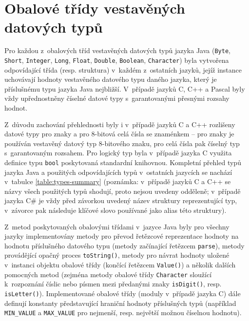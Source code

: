 \documentclass[czech,BP]{thesiskiv}
\begin{document}
\section{Obalové třídy vestavěných datových typů}
Pro každou z~obalových tříd vestavěných datových typů jazyka Java (\texttt{Byte}, \texttt{Short}, \texttt{Integer}, \texttt{Long}, \texttt{Float}, \texttt{Double}, \texttt{Boolean}, \texttt{Character}) byla vytvořena odpovídající třída (resp. struktura) v~každém z~ostatních jazyků, jejíž instance uchovávají hodnoty vestavěného datového typu daného jazyka, který je příslušnému typu jazyka Java nejbližší. V~případě jazyků C, C++ a Pascal byly vždy upřednostněny číselné datové typy s~garantovanými přesnými rozsahy hodnot.\par
Z~důvodu zachování přehlednosti byly i v~případě jazyků C a C++ rozlišeny datové typy pro znaky a pro 8-bitová celá čísla se znaménkem -- pro znaky je používán vestavěný datový typ 8-bitového znaku, pro celá čísla pak číselný typ s~garantovaným rozsahem. Pro logický typ byla v~případě jazyka C využita definice typu \texttt{bool} poskytovaná standardní knihovnou. Kompletní přehled typů jazyka Java a použitých odpovídajících typů v~ostatních jazycích se nachází v~tabulce \ref{table:types-summary}
(poznámka: v~případě jazyků C a C++ se názvy všech použitých typů shodují, proto nejsou uvedeny odděleně; v~případě jazyka C\# je vždy před závorkou uvedený název struktury reprezentující typ, v~závorce pak následuje klíčové slovo používané jako alias této struktury).\par
Z~metod poskytovaných obalovými třídami v~jazyce Java byly pro všechny jazyky implementovány metody pro převod řetězcové reprezentace hodnoty na hodnotu příslušného datového typu (metody začínající řetězcem \texttt{parse}), metody provádějící opačný proces \texttt{toString()}, metody pro návrat hodnoty uložené v~instanci objektu obalové třídy (končící řetězcem \texttt{Value()}) a několik dalších pomocných metod (zejména metody obalové třídy \texttt{Character} sloužící k~rozpoznání číslic nebo písmen mezi předanými znaky \texttt{isDigit()}, resp. \texttt{isLetter()}). Implementované obalové třídy (moduly v~případě jazyka C) dále definují konstanty představující hraniční hodnoty příslušných typů (například \texttt{MIN\_VALUE} a \texttt{MAX\_VALUE} pro nejmenší, resp. největší možnou číselnou hodnotu).\par
\end{document}
